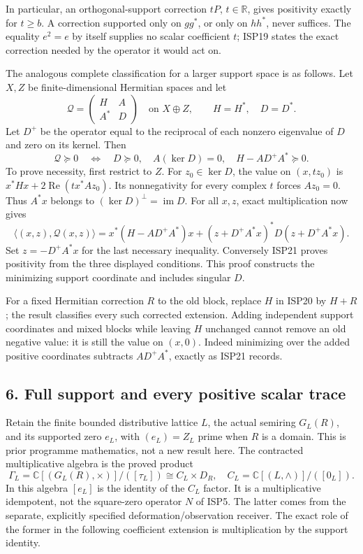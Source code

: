 \documentclass[
  10pt,
  a4paper,
]{article}
\begin{document}
In particular, an orthogonal-support correction \(tP\),
\(t\in\mathbb R\), gives positivity exactly for \(t\ge b\). A correction
supported only on \(gg^*\), or only on \(hh^*\), never suffices. The
equality \(e^2=e\) by itself supplies no scalar coefficient \(t\); ISP19
states the exact correction needed by the operator it would act on.

The analogous complete classification for a larger support space is as
follows. Let \(X,Z\) be finite-dimensional Hermitian spaces and let \[
\mathcal Q=\begin{pmatrix}H&A\\A^*&D\end{pmatrix}
\quad\text{on }X\oplus Z,
\qquad H=H^*,\quad D=D^*.
\] Let \(D^+\) be the operator equal to the reciprocal of each nonzero
eigenvalue of \(D\) and zero on its kernel. Then \[
\boxed{\mathcal Q\succeq0\quad\Longleftrightarrow\quad
D\succeq0,\quad A(\ker D)=0,\quad H-AD^+A^*\succeq0.}
\tag{ISP20}
\] To prove necessity, first restrict to \(Z\). For \(z_0\in\ker D\),
the value on \((x,tz_0)\) is \(x^*Hx+2\operatorname{Re}(t x^*Az_0)\).
Its nonnegativity for every complex \(t\) forces \(Az_0=0\). Thus
\(A^*x\) belongs to \((\ker D)^\perp=\operatorname{im}D\). For all
\(x,z\), exact multiplication now gives \[
\langle(x,z),\mathcal Q(x,z)\rangle
=x^*(H-AD^+A^*)x
+(z+D^+A^*x)^*D(z+D^+A^*x).
\tag{ISP21}
\] Set \(z=-D^+A^*x\) for the last necessary inequality. Conversely
ISP21 proves positivity from the three displayed conditions. This proof
constructs the minimizing support coordinate and includes singular
\(D\).

For a fixed Hermitian correction \(R\) to the old block, replace \(H\)
in ISP20 by \(H+R\); the result classifies every such corrected
extension. Adding independent support coordinates and mixed blocks while
leaving \(H\) unchanged cannot remove an old negative value: it is still
the value on \((x,0)\). Indeed minimizing over the added positive
coordinates subtracts \(AD^+A^*\), exactly as ISP21 records.

\subsection{6. Full support and every positive scalar
trace}\label{full-support-and-every-positive-scalar-trace}

Retain the finite bounded distributive lattice \(L\), the actual
semiring \(G_L(R)\), and its supported zero \(e_L\), with \((e_L)=Z_L\)
prime when \(R\) is a domain. This is prior programme mathematics, not a
new result here. The contracted multiplicative algebra is the proved
product \[
\Gamma_L=\mathbb C[(G_L(R),\times)]/([\tau_L])
\cong C_L\times D_R,
\quad C_L=\mathbb C[(L,\wedge)]/([0_L]).
\tag{ISP22}
\] In this algebra \([e_L]\) is the identity of the \(C_L\) factor. It
is a multiplicative idempotent, not the square-zero operator \(N\) of
ISP5. The latter comes from the separate, explicitly specified
deformation/observation receiver. The exact role of the former in the
following coefficient extension is multiplication by the support
identity.
\end{document}
